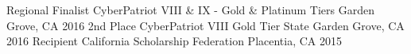 \begin{cvhonors}
  \cvhonor
    {Regional Finalist} %
    {CyberPatriot VIII \& IX - Gold \& Platinum Tiers} %
    {Garden Grove, CA} %
    {2016} %
  \cvhonor
    {2nd Place} %
    {CyberPatriot VIII Gold Tier State} %
    {Garden Grove, CA} %
    {2016} %
  \cvhonor
    {Recipient} %
    {California Scholarship Federation} %
    {Placentia, CA} %
    {2015} %
\end{cvhonors}
